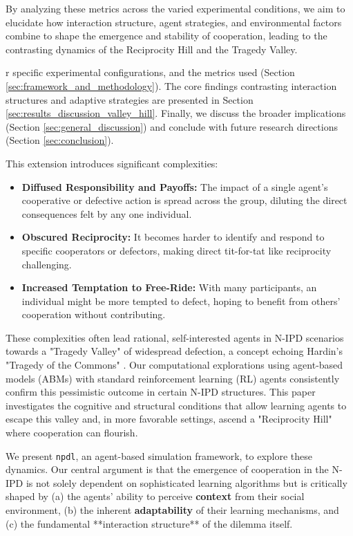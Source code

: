 \documentclass[]{llncs} %
\begin{document}
    By analyzing these metrics across the varied experimental conditions, we aim to elucidate how interaction structure, agent strategies, and environmental factors combine to shape the emergence and stability of cooperation, leading to the contrasting dynamics of the Reciprocity Hill and the Tragedy Valley.
    

r specific
experimental configurations, and the metrics used (Section
\ref{sec:framework_and_methodology}). The core findings contrasting
interaction structures and adaptive strategies are presented in
Section \ref{sec:results_discussion_valley_hill}. Finally, we discuss
the broader implications (Section \ref{sec:general_discussion}) and
conclude with future research directions (Section
\ref{sec:conclusion}).


This extension introduces significant complexities:
\begin{itemize}
    \item \textbf{Diffused Responsibility and Payoffs:} The impact of a single agent's cooperative or defective action is spread across the group, diluting the direct consequences felt by any one individual.
    \item \textbf{Obscured Reciprocity:} It becomes harder to identify and respond to specific cooperators or defectors, making direct tit-for-tat like reciprocity challenging.
    \item \textbf{Increased Temptation to Free-Ride:} With many participants, an individual might be more tempted to defect, hoping to benefit from others' cooperation without contributing.
\end{itemize}

These complexities often lead rational, self-interested agents in N-IPD scenarios towards a "Tragedy Valley" of widespread defection, a concept echoing Hardin's "Tragedy of the Commons" \cite{Hardin1968}. 
Our computational explorations using agent-based models (ABMs) with standard reinforcement learning (RL) agents consistently confirm this pessimistic outcome in certain N-IPD structures. This paper investigates the cognitive and structural conditions that allow learning agents to escape this valley and, in more favorable settings, ascend a "Reciprocity Hill" where cooperation can flourish.

We present \texttt{npdl}, an agent-based simulation framework, to explore these dynamics. Our central argument is that the emergence of cooperation in the N-IPD is not solely dependent on sophisticated learning algorithms but is critically shaped by (a) the agents' ability to perceive \textbf{context} from their social environment, (b) the inherent \textbf{adaptability} of their learning mechanisms, and (c) the fundamental **interaction structure** of the dilemma itself.
\end{document}
